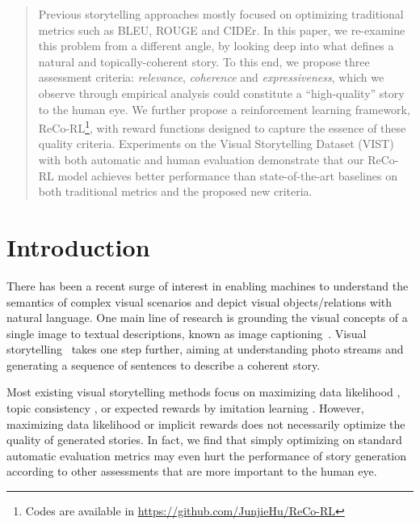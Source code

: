 \documentclass[letterpaper]{article} \usepackage{aaai20}  \usepackage{times}  \usepackage{helvet} \usepackage{courier}  \usepackage[hyphens]{url}  \usepackage{graphicx} \urlstyle{rm} \def\UrlFont{\rm}  \usepackage{graphicx}  \frenchspacing  \setlength{\pdfpagewidth}{8.5in}  \setlength{\pdfpageheight}{11in}  \usepackage{times}
\author{Junjie Hu\textsuperscript{1}, Yu Cheng\textsuperscript{2}, Zhe Gan\textsuperscript{2}, Jingjing Liu\textsuperscript{2}, Jianfeng Gao\textsuperscript{3}, Graham Neubig\textsuperscript{1} \\
\textsuperscript{1}Carnegie Mellon University, \textsuperscript{2}Microsoft Dynamics 365 AI Research, \textsuperscript{3}Microsoft Research \\
\{junjieh, gneubig\}@cs.cmu.edu, \{yu.cheng, zhe.gan, jingjl, jfgao\}@microsoft.com}
\begin{document}
\maketitle

\begin{abstract}
Previous storytelling approaches mostly focused on optimizing traditional metrics such as BLEU, ROUGE and CIDEr. In this paper, we re-examine this problem from a different angle, by looking deep into what defines a natural and topically-coherent story. To this end, we propose three assessment criteria: \emph{relevance}, \emph{coherence} and \emph{expressiveness}, which we observe through empirical analysis could constitute a ``high-quality'' story to the human eye. We further propose a reinforcement learning framework, ReCo-RL\footnote{Codes are available in \url{https://github.com/JunjieHu/ReCo-RL}}, with reward functions designed to capture the essence of these quality criteria. Experiments on the Visual Storytelling Dataset (VIST) with both automatic and human evaluation demonstrate that our ReCo-RL model achieves better performance than state-of-the-art baselines on both traditional metrics and the proposed new criteria.
\end{abstract}

\section{Introduction}
There has been a recent surge of interest in enabling machines to understand the semantics of complex visual scenarios and depict visual objects/relations with natural language. One main line of research is grounding the visual concepts of a single image to textual descriptions, known as image captioning~\cite{fang2015captions,vinyals2015show,you2016image}. Visual storytelling~\cite{huang2016visual} takes one step further, aiming at understanding photo streams and generating a sequence of sentences to describe a coherent story. 

Most existing visual storytelling methods focus on maximizing data likelihood \cite{yu2017hierarchically}, topic consistency \cite{huang2018hierarchically},  or expected rewards by imitation learning \cite{xinwang-wenhuchen-ACL-2018}. However, maximizing data likelihood or implicit rewards does not necessarily optimize the quality of generated stories. In fact, we find that simply optimizing on standard automatic evaluation metrics may even hurt the performance of story generation according to other assessments that are more important to the human eye.  
\end{document}
